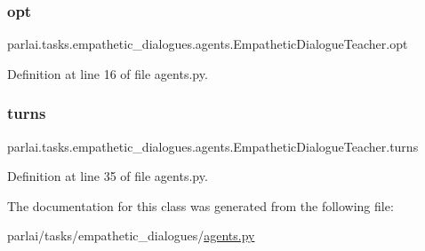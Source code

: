 \subsubsection{\texorpdfstring{opt}{opt}}
{\footnotesize\ttfamily parlai.\+tasks.\+empathetic\+\_\+dialogues.\+agents.\+Empathetic\+Dialogue\+Teacher.\+opt}



Definition at line 16 of file agents.\+py.

\mbox{\label{classparlai_1_1tasks_1_1empathetic__dialogues_1_1agents_1_1EmpatheticDialogueTeacher_ae0b4395b2dc54e9ad53da864518f4dfd}} 
\subsubsection{\texorpdfstring{turns}{turns}}
{\footnotesize\ttfamily parlai.\+tasks.\+empathetic\+\_\+dialogues.\+agents.\+Empathetic\+Dialogue\+Teacher.\+turns}



Definition at line 35 of file agents.\+py.



The documentation for this class was generated from the following file\+:\begin{DoxyCompactItemize}
\item 
parlai/tasks/empathetic\+\_\+dialogues/\hyperlink{parlai_2tasks_2empathetic__dialogues_2agents_8py}{agents.\+py}\end{DoxyCompactItemize}
